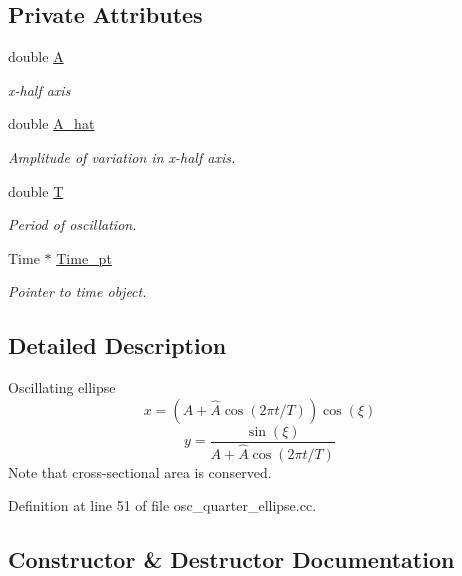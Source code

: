 \subsection*{Private Attributes}
\begin{DoxyCompactItemize}
\item 
double \hyperlink{classMyEllipse_aa2a0efd0a39f9d4fc307a6ff011682ed}{A}
\begin{DoxyCompactList}\small\item\em x-\/half axis \end{DoxyCompactList}\item 
double \hyperlink{classMyEllipse_a653e71cf296cdc86cc595d16f18004dd}{A\+\_\+hat}
\begin{DoxyCompactList}\small\item\em Amplitude of variation in x-\/half axis. \end{DoxyCompactList}\item 
double \hyperlink{classMyEllipse_ab098069ab23bbbd8f30b0da3523dc87f}{T}
\begin{DoxyCompactList}\small\item\em Period of oscillation. \end{DoxyCompactList}\item 
Time $\ast$ \hyperlink{classMyEllipse_abc1c4c863a599ce87bdff1abb9971953}{Time\+\_\+pt}
\begin{DoxyCompactList}\small\item\em Pointer to time object. \end{DoxyCompactList}\end{DoxyCompactItemize}


\subsection{Detailed Description}
Oscillating ellipse \[ x = (A + \widehat{A} \cos(2\pi t/T)) \cos(\xi) \] \[ y = \frac{\sin(\xi)}{A + \widehat{A} \cos(2\pi t/T)} \] Note that cross-\/sectional area is conserved. 

Definition at line 51 of file osc\+\_\+quarter\+\_\+ellipse.\+cc.



\subsection{Constructor \& Destructor Documentation}
\mbox{\label{classMyEllipse_a6d780f1f450d99e175842e88a3079069}} 
